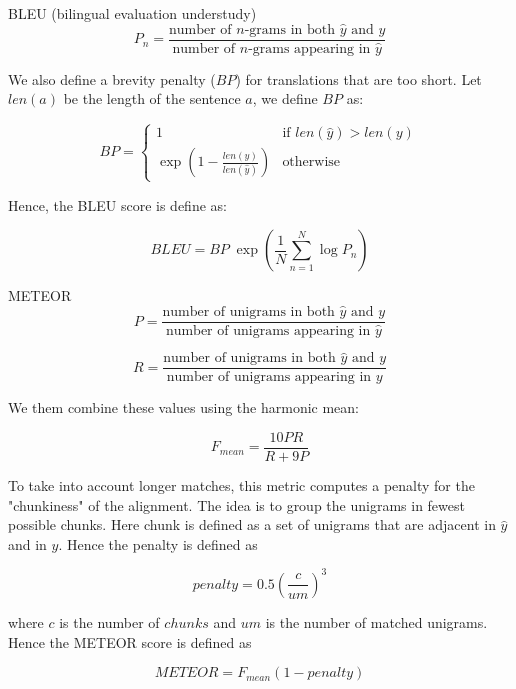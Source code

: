\documentclass[10pt]{beamer}
\begin{document}
\begin{frame}{BLEU (bilingual evaluation understudy) \cite{Papineni2001}}
\begin{equation}
P_n = \frac{\text{number of } n\text{-grams in both } \hat{y} \text{ and } y}{\text{number of } n\text{-grams appearing in } \hat{y}}
\end{equation}    

We also define a brevity penalty ($BP$) for translations that are too short. Let $len(a)$ be the length of the sentence $a$, we define $BP$ as:

\begin{equation}
BP=
\begin{cases}
1 & \text{if } len(\hat{y}) > len(y) \\
\exp\left( 1 - \frac{len(y)}{len(\hat{y})} \right) & \text{otherwise}
\end{cases}
\end{equation} 


Hence, the BLEU score is define as:

\begin{equation}
BLEU = BP \; \exp \left(\frac{1}{N}  \sum_{n=1}^{N} \log P_n \right)
\end{equation}
\end{frame}


\begin{frame}{METEOR}
\begin{equation}
P = \frac{\text{number of } \text{unigrams in both } \hat{y} \text{ and } y}{\text{number of } \text{unigrams appearing in } \hat{y}}
\end{equation}    


\begin{equation}
R = \frac{\text{number of } \text{unigrams in both } \hat{y} \text{ and } y}{\text{number of } \text{unigrams appearing in } y}
\end{equation}    

We them combine these values using the harmonic mean:

\begin{equation}
F_{mean} = \frac{10 P R}{R + 9P}
\end{equation}

To take into account longer matches, this metric computes a penalty for the "chunkiness" of the alignment. The idea is to group the unigrams in fewest possible chunks. Here chunk is defined as a set of unigrams that are adjacent in $\hat{y}$ and in $y$. Hence the penalty is defined as

\begin{equation}
penalty = 0.5 \left( \frac{c}{um} \right)^{3}
\end{equation}

where $c$ is the number of $chunks$ and $um$ is the number of matched unigrams. Hence the METEOR score is defined as

\begin{equation}
METEOR = F_{mean} (1 - penalty)
\end{equation}
\end{frame}
\end{document}
